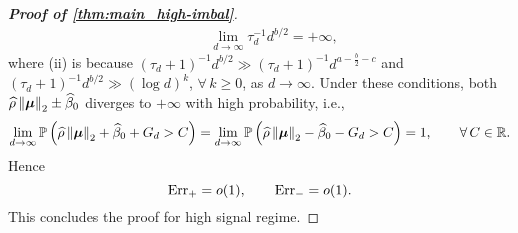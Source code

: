 \begin{proof}[\textbf{Proof of \cref{thm:main_high-imbal}}]
\begin{align*}
    \qquad
    \lim_{d \to \infty} \tau_d^{-1} d^{b/2} = +\infty,
\end{align*}
where (ii) is because $(\tau_d + 1)^{-1}d^{b/2} \gg (\tau_d + 1)^{-1}d^{a-\frac{b}{2}-c}$ and $(\tau_d + 1)^{-1}d^{b/2} \gg (\log d)^k$, $\forall\, k \ge 0$, as $d \to \infty$. Under these conditions, both $\widehat\rho \left\|{{\boldsymbol{\mu}}}\right\|_2 \pm \widehat\beta_0$ diverges to $+\infty$ with high probability, i.e.,
\begin{equation*}
    \lim_{d \to \infty} \mathbb{P}\left(\widehat\rho \left\|{{\boldsymbol{\mu}}}\right\|_2 + \widehat\beta_0 + G_d > C\right) 
    =
    \lim_{d \to \infty} \mathbb{P}\left(\widehat\rho \left\|{{\boldsymbol{\mu}}}\right\|_2 - \widehat\beta_0 - G_d > C\right) 
    = 1,
    \qquad
    \forall\, C \in \mathbb{R}.
\end{equation*}
Hence
\begin{equation*}
    \mathrm{Err}_+ = o(1), \qquad \mathrm{Err}_- = o(1).
\end{equation*}
This concludes the proof for high signal regime.



\end{proof}
